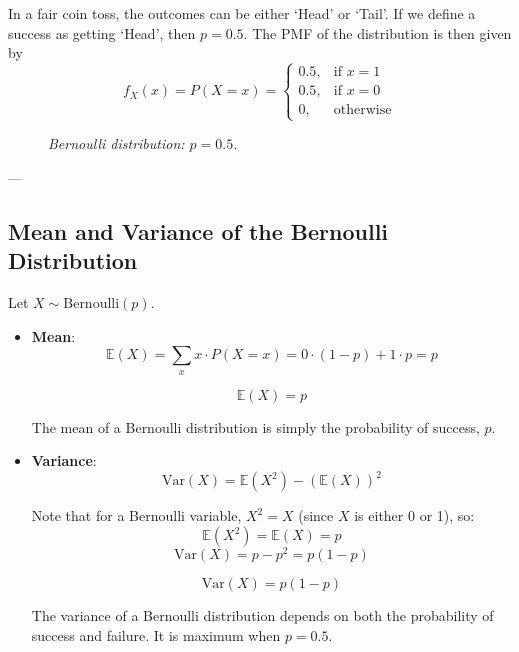 \documentclass[twoside]{book}
\begin{document}
In a fair coin toss, the outcomes can be either `Head' or `Tail'. If we define a success as getting `Head', then $p = 0.5$. The PMF of the distribution is then given by
\[
f_X(x) = P(X = x) =
\begin{cases}
0.5, & \text{if } x = 1 \\
0.5, & \text{if } x = 0 \\
0, & \text{otherwise}
\end{cases}
\]

\begin{figure}[H]
\begin{center}
\end{center}
\caption{\textit{Bernoulli distribution: $p = 0.5$.}}
\end{figure}

---

\subsection{Mean and Variance of the Bernoulli Distribution}

Let $X \sim \text{Bernoulli}(p)$.
\begin{itemize}
    \item \textbf{Mean}:
\[
\mathbb{E}(X) = \sum_{x} x \cdot P(X = x) = 0 \cdot (1 - p) + 1 \cdot p = p
\]
\begin{textbox}
    \[
\mathbb{E}(X) = p
\]
\end{textbox}

The mean of a Bernoulli distribution is simply the probability of success, $p$.


\item \textbf{Variance}:
\[
\text{Var}(X) = \mathbb{E}(X^2) - (\mathbb{E}(X))^2
\]

Note that for a Bernoulli variable, $X^2 = X$ (since $X$ is either 0 or 1), so:
\[
\mathbb{E}(X^2) = \mathbb{E}(X) = p
\]
\[
\text{Var}(X) = p - p^2 = p(1 - p)
\]
\begin{textbox}
    \[
\text{Var}(X) = p(1 - p)
\]
\end{textbox}

The variance of a Bernoulli distribution depends on both the probability of success and failure. It is maximum when $p = 0.5$.
\end{itemize}
\end{document}
